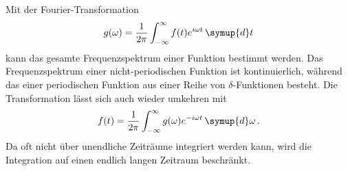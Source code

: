 Mit der Fourier-Transformation
\begin{equation}
    g(\omega) = \frac{1}{2\pi} \int_{-\infty}^{\infty} f(t) e^{i\omega t} \, \symup{d}t
\end{equation}
kann das gesamte Frequenzspektrum einer Funktion bestimmt werden.
Das Frequenzspektrum einer nicht-periodischen Funktion ist kontinuierlich, während das einer periodischen Funktion aus einer Reihe von $\delta$-Funktionen besteht.
Die Transformation lässt sich auch wieder umkehren mit
\begin{equation}
    f(t) = \frac{1}{2\pi} \int_{-\infty}^{\infty} g(\omega) e^{-i\omega t} \, \symup{d}\omega \, .
\end{equation}
Da oft nicht über unendliche Zeiträume integriert werden kann, wird die Integration auf einen endlich langen Zeitraum beschränkt.